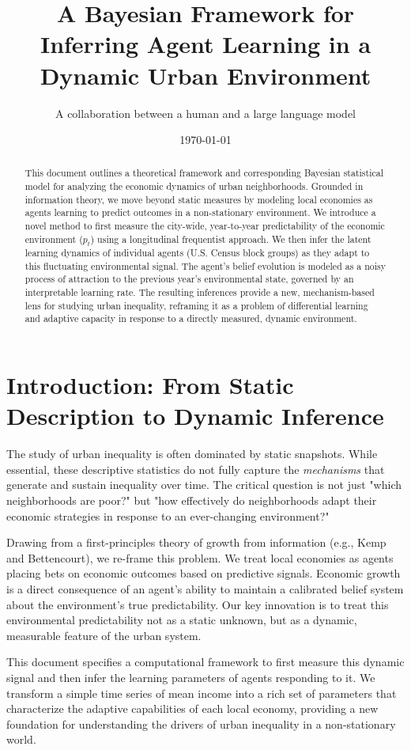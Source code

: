 \documentclass{article}
\title{A Bayesian Framework for Inferring Agent Learning in a Dynamic Urban Environment}
\author{A collaboration between a human and a large language model}
\date{\today}
\begin{document}
\maketitle

\begin{abstract}
    This document outlines a theoretical framework and corresponding Bayesian statistical model for analyzing the economic dynamics of urban neighborhoods. Grounded in information theory, we move beyond static measures by modeling local economies as agents learning to predict outcomes in a non-stationary environment. We introduce a novel method to first measure the city-wide, year-to-year predictability of the economic environment ($p_t$) using a longitudinal frequentist approach. We then infer the latent learning dynamics of individual agents (U.S. Census block groups) as they adapt to this fluctuating environmental signal. The agent's belief evolution is modeled as a noisy process of attraction to the previous year's environmental state, governed by an interpretable learning rate. The resulting inferences provide a new, mechanism-based lens for studying urban inequality, reframing it as a problem of differential learning and adaptive capacity in response to a directly measured, dynamic environment.
\end{abstract}

\section{Introduction: From Static Description to Dynamic Inference}
The study of urban inequality is often dominated by static snapshots. While essential, these descriptive statistics do not fully capture the \textit{mechanisms} that generate and sustain inequality over time. The critical question is not just "which neighborhoods are poor?" but "how effectively do neighborhoods adapt their economic strategies in response to an ever-changing environment?"

Drawing from a first-principles theory of growth from information (e.g., Kemp and Bettencourt), we re-frame this problem. We treat local economies as agents placing bets on economic outcomes based on predictive signals. Economic growth is a direct consequence of an agent's ability to maintain a calibrated belief system about the environment's true predictability. Our key innovation is to treat this environmental predictability not as a static unknown, but as a dynamic, measurable feature of the urban system.

This document specifies a computational framework to first measure this dynamic signal and then infer the learning parameters of agents responding to it. We transform a simple time series of mean income into a rich set of parameters that characterize the adaptive capabilities of each local economy, providing a new foundation for understanding the drivers of urban inequality in a non-stationary world.
\end{document}
